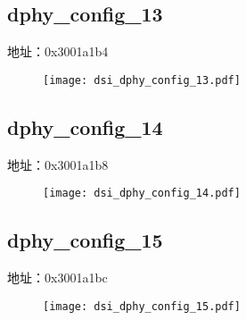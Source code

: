 \subsection{dphy\_config\_13}
\label{dsi-dphy-config-13}
地址：0x3001a1b4
 \begin{figure}[H]
\texttt{[image: dsi\_dphy\_config\_13.pdf]}
\end{figure}

\subsection{dphy\_config\_14}
\label{dsi-dphy-config-14}
地址：0x3001a1b8
 \begin{figure}[H]
\texttt{[image: dsi\_dphy\_config\_14.pdf]}
\end{figure}

\subsection{dphy\_config\_15}
\label{dsi-dphy-config-15}
地址：0x3001a1bc
 \begin{figure}[H]
\texttt{[image: dsi\_dphy\_config\_15.pdf]}
\end{figure}

